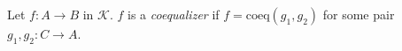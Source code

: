 Let $f: A \longrightarrow B$ in $\mathcal{K}$. $f$ is a \textit{coequalizer} if $f = \mathrm{coeq}(g_1, g_2)$ for some pair $g_1, g_2: C \longrightarrow A$.
